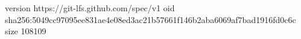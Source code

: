 version https://git-lfs.github.com/spec/v1
oid sha256:5049cc97095ee831ae4e08ed3ac21b57661f146b2aba6069af7bad1916fd0c6c
size 108109
